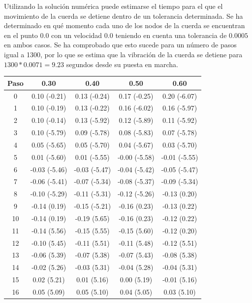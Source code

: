 \documentclass[11pt]{article}
\begin{document}
Utilizando la solución numérica puede estimarse el tiempo para el que el movimiento de la
cuerda se detiene dentro de un tolerancia determinada. Se ha determinado en qué momento
cada uno de los nodos de la cuerda se encuentran en el punto $0.0$ con un velocidad $0.0$
teniendo en cuenta una tolerancia de $0.0005$ en ambos casos. Se ha comprobado que esto
sucede para un número de pasos igual a 1300, por lo que se estima que la vibración de la
cuerda se detiene para $1300 * 0.0071 = 9.23$ segundos desde su puesta en marcha.

\begin{table}
\center
\begin{small}
\begin{tabular}{ c c c c c }
\hline
Paso & 0.30 & 0.40 & 0.50 & 0.60 \\
\hline
\hline
0 & 0.10 (-0.21) & 0.13 (-0.24) & 0.17 (-0.25) & 0.20 (-6.07) \\
1 & 0.10 (-0.19) & 0.13 (-0.22) & 0.16 (-6.02) & 0.16 (-5.97) \\
2 & 0.10 (-0.14) & 0.13 (-5.92) & 0.12 (-5.89) & 0.11 (-5.92) \\
3 & 0.10 (-5.79) & 0.09 (-5.78) & 0.08 (-5.83) & 0.07 (-5.78) \\
4 & 0.05 (-5.65) & 0.05 (-5.70) & 0.04 (-5.67) & 0.03 (-5.70) \\
5 & 0.01 (-5.60) & 0.01 (-5.55) & -0.00 (-5.58) & -0.01 (-5.55) \\
6 & -0.03 (-5.46) & -0.03 (-5.47) & -0.04 (-5.42) & -0.05 (-5.47) \\
7 & -0.06 (-5.41) & -0.07 (-5.34) & -0.08 (-5.37) & -0.09 (-5.34) \\
8 & -0.10 (-5.29) & -0.11 (-5.31) & -0.12 (-5.26) & -0.13 (0.20) \\
9 & -0.14 (0.19) & -0.15 (-5.21) & -0.16 (0.23) & -0.13 (0.22) \\
10 & -0.14 (0.19) & -0.19 (5.65) & -0.16 (0.23) & -0.12 (0.22) \\
11 & -0.14 (5.56) & -0.15 (5.55) & -0.15 (5.60) & -0.12 (0.20) \\
12 & -0.10 (5.45) & -0.11 (5.51) & -0.11 (5.48) & -0.12 (5.51) \\
13 & -0.06 (5.39) & -0.07 (5.38) & -0.07 (5.43) & -0.08 (5.38) \\
14 & -0.02 (5.26) & -0.03 (5.31) & -0.04 (5.28) & -0.04 (5.31) \\
15 & 0.02 (5.21) & 0.01 (5.16) & 0.00 (5.19) & -0.01 (5.16) \\
16 & 0.05 (5.09) & 0.05 (5.10) & 0.04 (5.05) & 0.03 (5.10) \\

\end{tabular}
\end{small}
\end{table}
\end{document}
